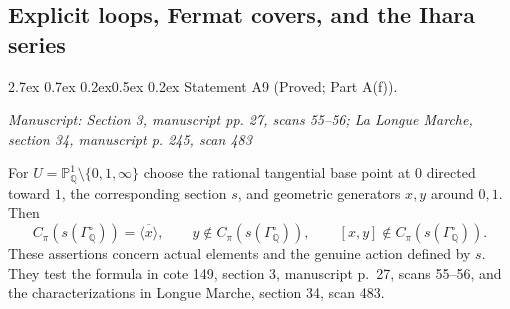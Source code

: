 \documentclass[11pt,a4paper]{article}
\makeatletter
\newcommand{\passage}[1]{\par\smallskip\noindent\textit{Manuscript: #1}\par\smallskip}
\renewcommand\paragraph{\@startsection{paragraph}{4}{\z@}%
  {2.7ex \@plus 0.7ex \@minus 0.2ex}{0.5ex \@plus 0.2ex}%
  {\normalfont\normalsize\bfseries}}
\makeatother
\begin{document}


\subsection{Explicit loops, Fermat covers, and the Ihara series}
\paragraph{Statement A9 (Proved; Part A(f)).}\label{res:A9}
\passage{Section 3, manuscript pp. 27, scans 55–56; La Longue Marche, section 34, manuscript p. 245, scan 483}

For $U=\mathbb P^1_{\mathbb Q}\setminus\{0,1,\infty\}$ choose the rational tangential base point at $0$ directed toward $1$, the corresponding section $s$, and geometric generators $x,y$ around $0,1$. Then
\[
 C_\pi(s(\Gamma_{\mathbb Q}^{\circ}))=\overline{\langle x\rangle},
 \qquad y\notin C_\pi(s(\Gamma_{\mathbb Q}^{\circ})),
 \qquad [x,y]\notin C_\pi(s(\Gamma_{\mathbb Q}^{\circ})).
\]
These assertions concern actual elements and the genuine action defined by $s$. They test the formula in cote 149, section 3, manuscript p.~27, scans 55--56, and the characterizations in Longue Marche, section 34, scan 483.
\end{document}
